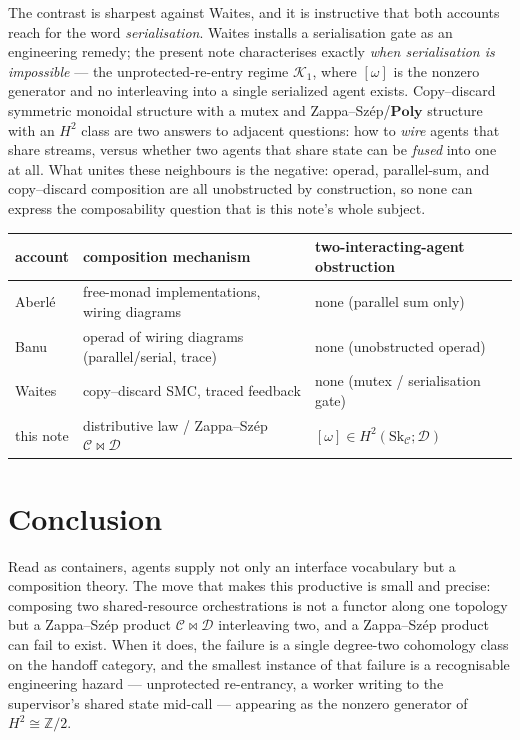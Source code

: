 \documentclass[11pt]{amsart}
\theoremstyle{definition}
\theoremstyle{remark}
\newcommand{\C}{\mathcal{C}}
\newcommand{\D}{\mathcal{D}}
\newcommand{\K}{\mathcal{K}}
\newcommand{\Sk}{\mathrm{Sk}}
\newcommand{\Poly}{\mathbf{Poly}}
\newcommand{\dir}{\mathcal{D}}
\begin{document}
The contrast is sharpest against Waites, and it is instructive that both accounts reach for the word
\emph{serialisation}. Waites installs a serialisation gate as an engineering remedy; the present note
characterises exactly \emph{when serialisation is impossible} --- the unprotected-re-entry regime
$\K_1$, where $[\omega]$ is the nonzero generator and no interleaving into a single serialized agent
exists. Copy--discard symmetric monoidal structure with a mutex and Zappa--Sz\'ep/$\Poly$ structure
with an $H^2$ class are two answers to adjacent questions: how to \emph{wire} agents that share
streams, versus whether two agents that share state can be \emph{fused} into one at all. What unites
these neighbours is the negative: operad, parallel-sum, and copy--discard composition are all
unobstructed by construction, so none can express the composability question that is this note's
whole subject.

\begin{center}
\renewcommand{\arraystretch}{1.3}
\begin{tabular}{@{}lll@{}}
\toprule
account & composition mechanism & two-interacting-agent obstruction \\
\midrule
Aberl\'e \cite{aberle} & free-monad implementations, wiring diagrams & none (parallel sum only) \\
Banu \cite{banu} & operad of wiring diagrams (parallel/serial, trace) & none (unobstructed operad) \\
Waites \cite{waites} & copy--discard SMC, traced feedback & none (mutex / serialisation gate) \\
this note & distributive law / Zappa--Sz\'ep $\C\bowtie\D$ & $[\omega]\in H^2(\Sk_\C;\dir)$ \\
\bottomrule
\end{tabular}
\end{center}

\section{Conclusion}\label{sec:concl}

Read as containers, agents supply not only an interface vocabulary but a composition theory.
The move that makes this productive is small and precise: composing two shared-resource
orchestrations is not a functor along one topology but a Zappa--Sz\'ep product $\C\bowtie\D$
interleaving two, and a Zappa--Sz\'ep product can fail to exist. When it does, the failure is a
single degree-two cohomology class on the handoff category, and the smallest instance of that
failure is a recognisable engineering hazard --- unprotected re-entrancy, a worker writing to
the supervisor's shared state mid-call --- appearing as the nonzero generator of
$H^2\cong\mathbb Z/2$.
\end{document}

